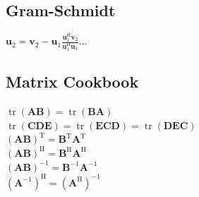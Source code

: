 \documentclass[english]{latex4ei/latex4ei_sheet}
\begin{document}
\begin{sectionbox}
  \subsection{Gram-Schmidt}
  $\boldsymbol{u}_{2}=\boldsymbol{v}_{2}-\boldsymbol{u}_{1} \frac{\boldsymbol{u}_{1}^{\mathrm{H}} \boldsymbol{v}_{2}}{\boldsymbol{u}_{1}^{\mathrm{H}} \boldsymbol{u}_{1}} \dots$\\
\end{sectionbox}

\begin{sectionbox}
  \subsection{Matrix Cookbook}
  $\operatorname{tr}(\boldsymbol{A} \boldsymbol{B})=\operatorname{tr}(\boldsymbol{B} \boldsymbol{A})$\\
  $\operatorname{tr}(\boldsymbol{CDE})=\operatorname{tr}(\boldsymbol{ECD})=\operatorname{tr}(\boldsymbol{DEC})$\\
  $(\boldsymbol{A} \boldsymbol{B})^{\mathrm{T}}=\boldsymbol{B}^{\mathrm{T}} \boldsymbol{A}^{\mathrm{T}}$\\
  $(\boldsymbol{A B})^{\mathrm{H}}=\boldsymbol{B}^{\mathrm{H}} \boldsymbol{A}^{\mathrm{H}}$\\
  $(\boldsymbol{A} \boldsymbol{B})^{-1}=\boldsymbol{B}^{-1} \boldsymbol{A}^{-1}$\\
  $\left(\boldsymbol{A}^{-1}\right)^{\mathrm{H}}=\left(\boldsymbol{A}^{\mathrm{H}}\right)^{-1}$\\

\end{sectionbox}
\end{document}
